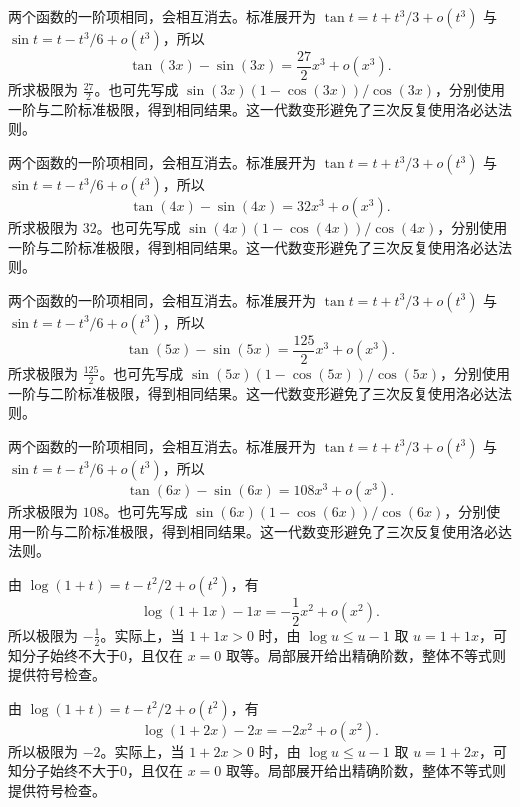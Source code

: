 \documentclass[UTF8,12pt,a4paper,fontset=fandol]{ctexart}
\begin{document}
\begin{solve}\label{ans:c5q15}
两个函数的一阶项相同，会相互消去。标准展开为 $\tan t=t+t^3/3+o(t^3)$ 与 $\sin t=t-t^3/6+o(t^3)$，所以
\[
\tan(3x)-\sin(3x)=\frac{27}{2}x^3+o(x^3).
\]
所求极限为 $\frac{27}{2}$。也可先写成 $\sin(3x)(1-\cos(3x))/\cos(3x)$，分别使用一阶与二阶标准极限，得到相同结果。这一代数变形避免了三次反复使用洛必达法则。
\end{solve}

\begin{solve}\label{ans:c5q16}
两个函数的一阶项相同，会相互消去。标准展开为 $\tan t=t+t^3/3+o(t^3)$ 与 $\sin t=t-t^3/6+o(t^3)$，所以
\[
\tan(4x)-\sin(4x)=32x^3+o(x^3).
\]
所求极限为 $32$。也可先写成 $\sin(4x)(1-\cos(4x))/\cos(4x)$，分别使用一阶与二阶标准极限，得到相同结果。这一代数变形避免了三次反复使用洛必达法则。
\end{solve}

\begin{solve}\label{ans:c5q17}
两个函数的一阶项相同，会相互消去。标准展开为 $\tan t=t+t^3/3+o(t^3)$ 与 $\sin t=t-t^3/6+o(t^3)$，所以
\[
\tan(5x)-\sin(5x)=\frac{125}{2}x^3+o(x^3).
\]
所求极限为 $\frac{125}{2}$。也可先写成 $\sin(5x)(1-\cos(5x))/\cos(5x)$，分别使用一阶与二阶标准极限，得到相同结果。这一代数变形避免了三次反复使用洛必达法则。
\end{solve}

\begin{solve}\label{ans:c5q18}
两个函数的一阶项相同，会相互消去。标准展开为 $\tan t=t+t^3/3+o(t^3)$ 与 $\sin t=t-t^3/6+o(t^3)$，所以
\[
\tan(6x)-\sin(6x)=108x^3+o(x^3).
\]
所求极限为 $108$。也可先写成 $\sin(6x)(1-\cos(6x))/\cos(6x)$，分别使用一阶与二阶标准极限，得到相同结果。这一代数变形避免了三次反复使用洛必达法则。
\end{solve}

\begin{solve}\label{ans:c5q19}
由 $\log(1+t)=t-t^2/2+o(t^2)$，有
\[
\log(1+1x)-1x=-\frac{1}{2}x^2+o(x^2).
\]
所以极限为 $-\frac{1}{2}$。实际上，当 $1+1x>0$ 时，由 $\log u\le u-1$ 取 $u=1+1x$，可知分子始终不大于0，且仅在 $x=0$ 取等。局部展开给出精确阶数，整体不等式则提供符号检查。
\end{solve}

\begin{solve}\label{ans:c5q20}
由 $\log(1+t)=t-t^2/2+o(t^2)$，有
\[
\log(1+2x)-2x=-2x^2+o(x^2).
\]
所以极限为 $-2$。实际上，当 $1+2x>0$ 时，由 $\log u\le u-1$ 取 $u=1+2x$，可知分子始终不大于0，且仅在 $x=0$ 取等。局部展开给出精确阶数，整体不等式则提供符号检查。
\end{solve}
\end{document}

